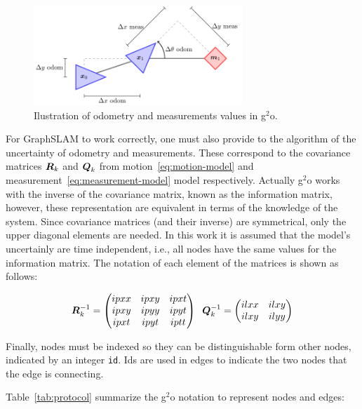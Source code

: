 \begin{figure}[htbp!]
    \centering
    \includegraphics[width=0.7\textwidth]{tikz/protocol.pdf}
    \caption{Ilustration of odometry and measurements values in g$^2$o.}
    \label{fig:protocol}
\end{figure}

For GraphSLAM to work correctly, one must also provide to the algorithm of the uncertainty of odometry and measurements. These correspond to the covariance matrices $\boldsymbol{R}_k$ and $\boldsymbol{Q}_k$ from motion~\eqref{eq:motion-model} and measurement~\eqref{eq:measurement-model} model respectively. Actually g$^2$o works with the inverse of the covariance matrix, known as the information matrix, however, these representation are equivalent in terms of the knowledge of the system. Since covariance matrices (and their inverse) are symmetrical, only the upper diagonal elements are needed. In this work it is assumed that the model's uncertainly are time independent, i.e., all nodes have the same values for the information matrix. The notation of each element of the matrices is shown as follows:

\begin{equation}
    \boldsymbol{R}^{-1}_k = \begin{pmatrix}
    ipxx & ipxy & ipxt\\
    ipxy & ipyy & ipyt\\
    ipxt & ipyt & iptt
    \end{pmatrix} \;\;
    \boldsymbol{Q}^{-1}_k = \begin{pmatrix}
    ilxx & ilxy\\
    ilxy & ilyy
    \end{pmatrix} 
    \label{eq:info-matrices}
\end{equation}

Finally, nodes must be indexed so they can be distinguishable form other nodes, indicated by an integer \texttt{id}. Ids are used in edges to indicate the two nodes that the edge is connecting.

Table~\ref{tab:protocol} summarize the g$^2$o notation to represent nodes and edges:


